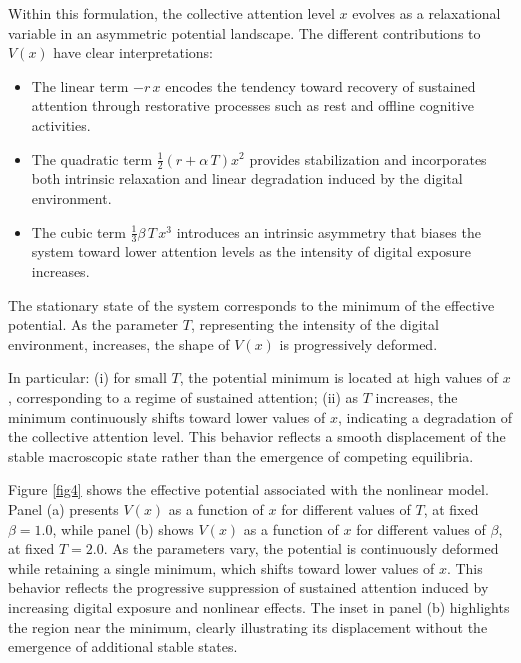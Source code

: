 \documentclass[preprint,12pt]{elsarticle}
\begin{document}
Within this formulation, the collective attention level $x$ evolves as a relaxational variable in an asymmetric potential landscape. The different contributions to $V(x)$ have clear interpretations:
\begin{itemize}

\item The linear term $-r\,x$ encodes the tendency toward recovery of sustained attention through restorative processes such as rest and offline cognitive activities.

\item The quadratic term $\frac{1}{2}(r+\alpha\,T)x^2$ provides stabilization and incorporates both intrinsic relaxation and linear degradation induced by the digital environment.

\item The cubic term $\frac{1}{3}\beta\,T\,x^3$ introduces an intrinsic asymmetry that biases the system toward lower attention levels as the intensity of digital exposure increases.

\end{itemize}



The stationary state of the system corresponds to the minimum of the effective potential. As the parameter $T$, representing the intensity of the digital environment, increases, the shape of $V(x)$ is progressively deformed.

In particular: (i) for small $T$, the potential minimum is located at high values of $x$, corresponding to a regime of sustained attention; (ii) as $T$ increases, the minimum continuously shifts toward lower values of $x$, indicating a degradation of the collective attention level. This behavior reflects a smooth displacement of the stable macroscopic state rather than the emergence of competing equilibria.

Figure \ref{fig4} shows the effective potential associated with the nonlinear model. Panel (a) presents $V(x)$ as a function of $x$ for different values of $T$, at fixed $\beta=1.0$, while panel (b) shows $V(x)$ as a function of $x$ for different values of $\beta$, at fixed $T=2.0$. As the parameters vary, the potential is continuously deformed while retaining a single minimum, which shifts toward lower values of $x$. This behavior reflects the progressive suppression of sustained attention induced by increasing digital exposure and nonlinear effects. The inset in panel (b) highlights the region near the minimum, clearly illustrating its displacement without the emergence of additional stable states.
\end{document}
